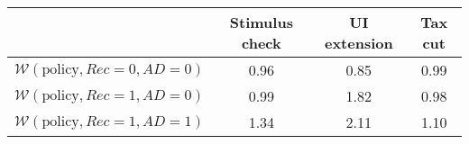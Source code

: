 \begin{tabular}{@{}lccc@{}} 
\toprule 
                          & Stimulus check      & UI extension    & Tax cut    \\  \midrule 
$\mathcal{W}(\text{policy}, Rec=0, AD=0)$ & 0.96  & 0.85  & 0.99     \\ 
$\mathcal{W}(\text{policy}, Rec=1, AD=0)$ & 0.99  & 1.82  & 0.98     \\ 
$\mathcal{W}(\text{policy}, Rec=1, AD=1)$ & 1.34  & 2.11  & 1.10     \\ 
\end{tabular}  
